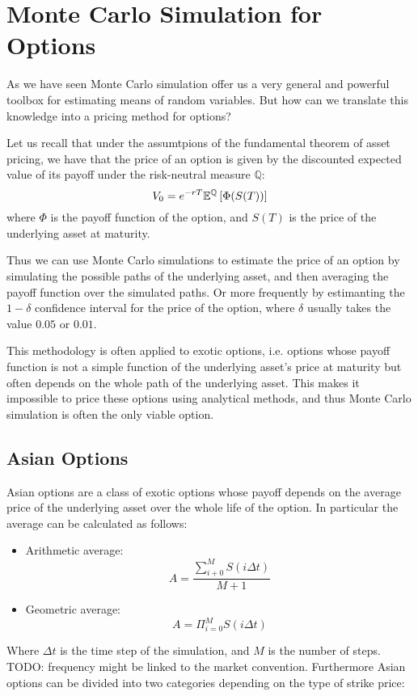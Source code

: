 \section{Monte Carlo Simulation for Options}
As we have seen Monte Carlo simulation offer us a very general and powerful
toolbox for estimating means of random variables. But how can we translate this
knowledge into a pricing method for options?

Let us recall that under the assumtpions of the fundamental theorem of asset
pricing, we have that the price of an option is given by the discounted
expected value of its payoff under the risk-neutral measure $\mathbb{Q}$:
\[ V_0 = e^{-rT} \mathbb{E}^{\mathbb{Q}} \left[ \Phi(S(T)) \right]\]
where $\Phi$ is the payoff function of the option, and $S(T)$ is the price of
the underlying asset at maturity.

Thus we can use Monte Carlo simulations to estimate the price of an option by
simulating the possible paths of the underlying asset, and then averaging the
payoff function over the simulated paths. Or more frequently by estimanting
the $1-\delta$ confidence interval for the price of the option, where $\delta$
usually takes the value $0.05$ or $0.01$.

This methodology is often applied to exotic options, i.e. options whose payoff
function is not a simple function of the underlying asset's price at maturity
but often depends on the whole path of the underlying asset. This makes it
impossible to price these options using analytical methods, and thus Monte
Carlo simulation is often the only viable option.

\subsection*{Asian Options}
Asian options are a class of exotic options whose payoff depends on the average
price of the underlying asset over the whole life of the option. In particular
the average can be calculated as follows:

\begin{itemize}
    \item Arithmetic average: \[ A = \frac{\sum^M_{i+0} S(i\Delta t)}{M+1} \]
    \item Geometric average: \[ A = \Pi_{i=0}^M S(i\Delta t) \]
\end{itemize}

Where $\Delta t$ is the time step of the simulation, and $M$ is the number of
steps. TODO: frequency might be linked to the market convention.
Furthermore Asian options can be divided into two categories depending on the
type of strike price:

